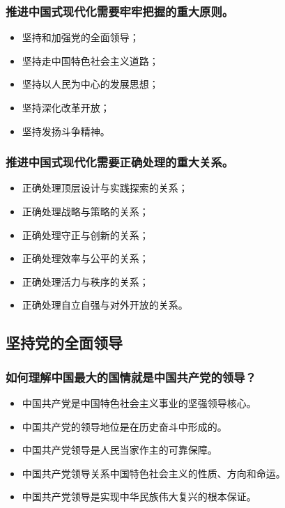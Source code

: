\documentclass{article}
\begin{document}
\subsubsection{推进中国式现代化需要牢牢把握的重大原则。}
\begin{itemize}
    \item 坚持和加强党的全面领导；
    \item 坚持走中国特色社会主义道路；
    \item 坚持以人民为中心的发展思想；
    \item 坚持深化改革开放；
    \item 坚持发扬斗争精神。
\end{itemize}

\subsubsection{推进中国式现代化需要正确处理的重大关系。}
\begin{itemize}
    \item 正确处理顶层设计与实践探索的关系；
    \item 正确处理战略与策略的关系；
    \item 正确处理守正与创新的关系；
    \item 正确处理效率与公平的关系；
    \item 正确处理活力与秩序的关系；
    \item 正确处理自立自强与对外开放的关系。
\end{itemize}

\subsection{坚持党的全面领导}

\subsubsection{如何理解中国最大的国情就是中国共产党的领导？}
\begin{itemize}
    \item 中国共产党是中国特色社会主义事业的坚强领导核心。
    \item 中国共产党的领导地位是在历史奋斗中形成的。
    \item 中国共产党领导是人民当家作主的可靠保障。
    \item 中国共产党领导关系中国特色社会主义的性质、方向和命运。
    \item 中国共产党领导是实现中华民族伟大复兴的根本保证。
\end{itemize}
\end{document}
